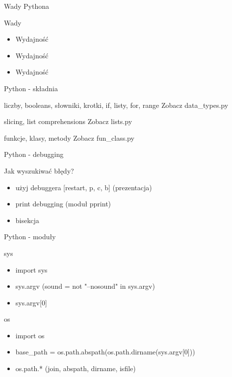 \documentclass{beamer}
\begin{document}
\begin{frame}{Wady Pythona}
  \begin{block}{Wady}
    \begin{itemize}
    \item Wydajność
    \item Wydajność
    \item Wydajność
    \end{itemize}
  \end{block}
\end{frame}

\begin{frame}{Python - składnia}
  \begin{block}{liczby, booleans, słowniki, krotki, if, listy, for, range}
    Zobacz data\_types.py
  \end{block}

  \begin{block}{slicing, list comprehensions}
    Zobacz lists.py
  \end{block}

  \begin{block}{funkcje, klasy, metody}
    Zobacz fun\_class.py
  \end{block}
\end{frame}

\begin{frame}{Python - debugging}
  \begin{block}{Jak wyszukiwać błędy?}
    \begin{itemize}
    \item użyj debuggera [restart, p, c, b] (prezentacja)
    \item print debugging (moduł pprint)
    \item bisekcja
    \end{itemize}
  \end{block}
\end{frame}

\begin{frame}{Python - moduły}
  \begin{block}{sys}
    \begin{itemize}
    \item import sys
    \item sys.argv (sound = not "--nosound" in sys.argv)
    \item sys.argv[0]
    \end{itemize}
  \end{block}

  \begin{block}{os}
    \begin{itemize}
    \item import os
    \item base\_path = os.path.abspath(os.path.dirname(sys.argv[0]))
    \item os.path.* (join, abspath, dirname, isfile)
    \end{itemize}
  \end{block}

\end{frame}
\end{document}
